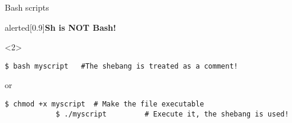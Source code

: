 \begin{frame}[fragile]{Bash scripts}
\begin{varblock}{alerted}[0.9\textwidth]{\textbf{Sh is NOT Bash!}}
    \end{varblock}
    \begin{onlyenv}<2>
        \begin{lstlisting}[style=MyBash]
            $ bash myscript   #The shebang is treated as a comment!
        \end{lstlisting}
        \centerline{or}
        \begin{lstlisting}[style=MyBash]
            $ chmod +x myscript  # Make the file executable
            $ ./myscript         # Execute it, the shebang is used!
        \end{lstlisting}
    \end{onlyenv}
\end{frame}


